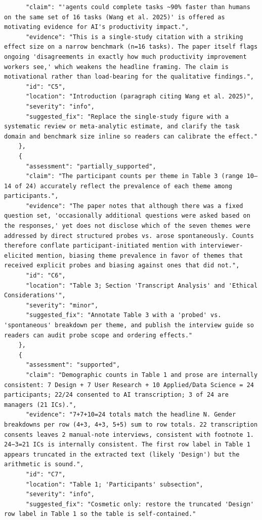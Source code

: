 \documentclass[11pt]{article}
\begin{document}
\begin{verbatim}
      "claim": "'agents could complete tasks ~90% faster than humans on the same set of 16 tasks (Wang et al. 2025)' is offered as motivating evidence for AI's productivity impact.",
      "evidence": "This is a single-study citation with a striking effect size on a narrow benchmark (n=16 tasks). The paper itself flags ongoing 'disagreements in exactly how much productivity improvement workers see,' which weakens the headline framing. The claim is motivational rather than load-bearing for the qualitative findings.",
      "id": "C5",
      "location": "Introduction (paragraph citing Wang et al. 2025)",
      "severity": "info",
      "suggested_fix": "Replace the single-study figure with a systematic review or meta-analytic estimate, and clarify the task domain and benchmark size inline so readers can calibrate the effect."
    },
    {
      "assessment": "partially_supported",
      "claim": "The participant counts per theme in Table 3 (range 10–14 of 24) accurately reflect the prevalence of each theme among participants.",
      "evidence": "The paper notes that although there was a fixed question set, 'occasionally additional questions were asked based on the responses,' yet does not disclose which of the seven themes were addressed by direct structured probes vs. arose spontaneously. Counts therefore conflate participant-initiated mention with interviewer-elicited mention, biasing theme prevalence in favor of themes that received explicit probes and biasing against ones that did not.",
      "id": "C6",
      "location": "Table 3; Section 'Transcript Analysis' and 'Ethical Considerations'",
      "severity": "minor",
      "suggested_fix": "Annotate Table 3 with a 'probed' vs. 'spontaneous' breakdown per theme, and publish the interview guide so readers can audit probe scope and ordering effects."
    },
    {
      "assessment": "supported",
      "claim": "Demographic counts in Table 1 and prose are internally consistent: 7 Design + 7 User Research + 10 Applied/Data Science = 24 participants; 22/24 consented to AI transcription; 3 of 24 are managers (21 ICs).",
      "evidence": "7+7+10=24 totals match the headline N. Gender breakdowns per row (4+3, 4+3, 5+5) sum to row totals. 22 transcription consents leaves 2 manual-note interviews, consistent with footnote 1. 24−3=21 ICs is internally consistent. The first row label in Table 1 appears truncated in the extracted text (likely 'Design') but the arithmetic is sound.",
      "id": "C7",
      "location": "Table 1; 'Participants' subsection",
      "severity": "info",
      "suggested_fix": "Cosmetic only: restore the truncated 'Design' row label in Table 1 so the table is self-contained."

\end{verbatim}
\end{document}
